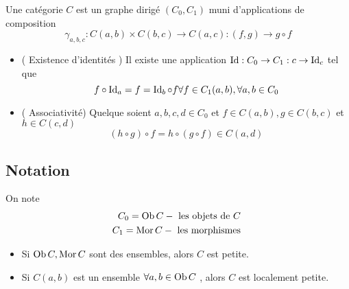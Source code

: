 \documentclass[../main.tex]{subfiles}
\begin{document}
\begin{defn}[Catégories]
	Une catégorie $C$ est un graphe dirigé $( C_0, C_1) $ muni d'applications de composition
	\[ 
		\gamma_{a,b,c} : C( a,b) \times C( b,c) \to C( a,c) : ( f,g) \to g\circ f
	\]
\begin{itemize}
	\item ( Existence d'identités ) Il existe une application $\operatorname{Id}: C_0 \to C_1: c \to \operatorname{Id}_c$ tel que
		\[ 
			f\circ \operatorname{Id}_a = f = \operatorname{Id}_b \circ f \forall f \in C_1( a,b) , \forall a,b \in C_0
		\]
	
	\item ( Associativité) Quelque soient $a,b,c,d \in C_0$ et $f \in C( a,b) , g \in C( b,c) $ et $h \in C( c,d) $ 
		\[ 
			( h \circ g) \circ f = h \circ ( g \circ f)  \in C( a,d) 
		\]

\end{itemize}
\end{defn}
\subsection*{Notation}
On note
\begin{align*}
C_0 = \operatorname{Ob} C - \text{ les objets de $C$  } \\
C_1 = \operatorname{Mor} C - \text{ les morphismes } 
\end{align*}
\begin{itemize}
\item Si $\operatorname{Ob} C, \operatorname{Mor} C	$  sont des ensembles, alors $C$ est petite.
\item Si $C( a,b) $ est un ensemble $\forall a, b \in \operatorname{Ob} C$ , alors $C$ est localement petite.	
\end{itemize}
\end{document}
